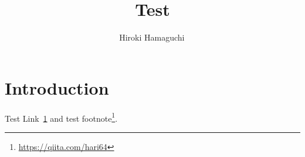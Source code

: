\documentclass[11pt]{article}
\begin{document}
\title{Test}

\author[1]{Hiroki Hamaguchi\,}
\date{}

\maketitle

\section{Introduction}\label{sec:introduction}

Test Link~\ref{sec:introduction} and test footnote\footnote{\url{https://qiita.com/hari64}}.
\end{document}
